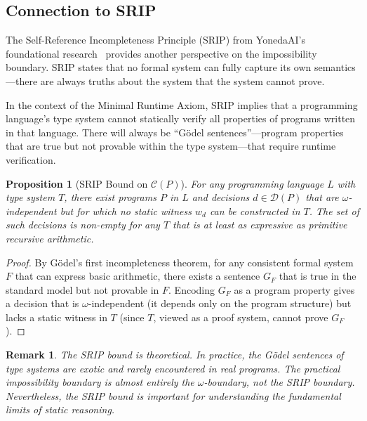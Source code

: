 \documentclass[11pt]{article}
\newtheorem{proposition}[theorem]{Proposition}
\newtheorem{remark}[theorem]{Remark}
\newcommand{\DP}{\mathcal{D}(P)}
\newcommand{\CP}{\mathcal{C}(P)}
\newcommand{\witness}{w_d}
\begin{document}
\subsection{Connection to SRIP}

The Self-Reference Incompleteness Principle (SRIP) from YonedaAI's foundational
research~\cite{long2025srip} provides another perspective on the impossibility boundary.
SRIP states that no formal system can fully capture its own semantics---there are always
truths about the system that the system cannot prove.

In the context of the Minimal Runtime Axiom, SRIP implies that a programming language's
type system cannot statically verify all properties of programs written in that language.
There will always be ``G\"{o}del sentences''---program properties that are true but not
provable within the type system---that require runtime verification.

\begin{proposition}[SRIP Bound on $\CP$]
\label{prop:srip}
For any programming language $L$ with type system $T$, there exist programs $P$ in $L$
and decisions $d \in \DP$ that are $\omega$-independent but for which no static witness
$\witness$ can be constructed in $T$. The set of such decisions is non-empty for any
$T$ that is at least as expressive as primitive recursive arithmetic.
\end{proposition}

\begin{proof}
By G\"{o}del's first incompleteness theorem, for any consistent formal system $F$
that can express basic arithmetic, there exists a sentence $G_F$ that is true in the
standard model but not provable in $F$. Encoding $G_F$ as a program property gives a
decision that is $\omega$-independent (it depends only on the program structure) but
lacks a static witness in $T$ (since $T$, viewed as a proof system, cannot prove $G_F$).
\end{proof}

\begin{remark}
The SRIP bound is \emph{theoretical}. In practice, the G\"{o}del sentences of type
systems are exotic and rarely encountered in real programs. The practical impossibility
boundary is almost entirely the $\omega$-boundary, not the SRIP boundary. Nevertheless,
the SRIP bound is important for understanding the \emph{fundamental} limits of static
reasoning.
\end{remark}


\end{document}
